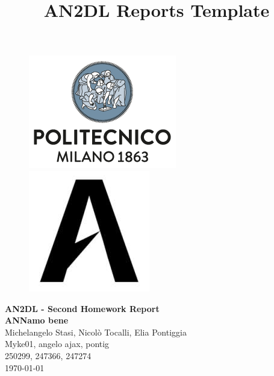 \documentclass[11pt]{article}
\title{AN2DL Reports Template}
\begin{document}
\begin{figure}[H]
    \raggedright
    \includegraphics[scale=0.4]{polimi.png} \hfill \includegraphics[scale=0.3]{airlab.jpeg}
\end{figure}

\vspace{5mm}

\begin{center}
    {\Large \textbf{AN2DL - Second Homework Report}}\\
    \vspace{2mm}
    {\Large \textbf{ANNamo bene}}\\
    \vspace{2mm}
    {\large Michelangelo Stasi,}
    {\large Nicolò Tocalli,}
    {\large Elia Pontiggia}\\
    \vspace{2mm}
    {Myke01,}
    {angelo ajax,}
    {pontig}\\
    \vspace{2mm}
    {250299,}
    {247366,}
    {247274}\\
    \vspace{5mm}
    \today
\end{center}
\vspace{5mm}
\end{document}
